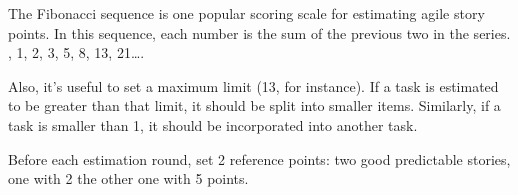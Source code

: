\vspace{3mm}

The Fibonacci sequence is one popular scoring scale for estimating agile
story points. In this sequence, each number is the sum of the
previous two in the series.\\


{\Large{}, 1, 2, 3, 5, 8, 13, 21\ldots.
}

\vspace{3mm}

Also, it’s useful to set a maximum limit (13, for instance).
If a task is estimated to be greater than that limit, it should
be split into smaller items. Similarly, if a task is smaller than 1,
it should be incorporated into another task.\\

\vspace{3mm}

Before each estimation round, set 2 reference points:
two good predictable stories, one with 2 the other one with 5 points.\\

\vspace{3mm}


\newslide

